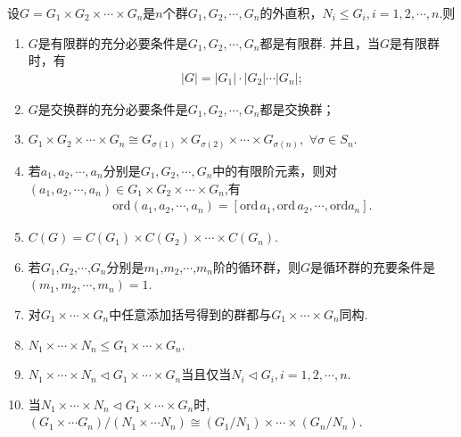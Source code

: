 \documentclass[../../main.tex]{subfiles}%
\begin{document}
\begin{theorem}\label{theorem:群的外直积的基本性质}
设$G =G_1 \times G_2\times \cdots \times G_n$是$n$个群$G_1,G_2,\cdots,G_n$的外直积，$N_i\leqslant G_i,i=1,2,\cdots,n$.则
\begin{enumerate}[(1)]
\item\label{theorem:群的外直积的基本性质-1} $G$是有限群的充分必要条件是$G_1,G_2,\cdots,G_n$都是有限群. 并且，当$G$是有限群时，有
\begin{align*}
|G| = |G_1| \cdot |G_2|\cdots|G_n|;
\end{align*}

\item\label{theorem:群的外直积的基本性质-2} $G$是交换群的充分必要条件是$G_1,G_2,\cdots,G_n$都是交换群；

\item\label{theorem:群的外直积的基本性质-3} $G_1\times G_2\times \cdots \times G_n\cong G_{\sigma \left( 1 \right)}\times G_{\sigma \left( 2 \right)}\times \cdots \times G_{\sigma \left( n \right)},\,\,\forall \sigma \in S_n.$

\item\label{theorem:群的外直积的基本性质-4} 若$a_1,a_2,\cdots,a_n$分别是$G_1,G_2,\cdots,G_n$中的有限阶元素，则对$(a_1,a_2,\cdots,a_n) \in G_1 \times G_2\times \cdots \times G_n$,有
\begin{align*}
\mathrm{ord}(a_1,a_2,\cdots ,a_n)=[\mathrm{ord}\,a_1,\mathrm{ord}\,a_2,\cdots ,\mathrm{ord}a_n].
\end{align*}

\item\label{theorem:群的外直积的基本性质-5} $C(G) = C(G_1) \times C(G_2) \times \cdots \times C(G_n)$.

\item\label{theorem:群的外直积的基本性质-6} 若$G_1$,$G_2$,$\cdots$,$G_n$分别是$m_1$,$m_2$,$\cdots$,$m_n$阶的循环群，则$G$是循环群的充要条件是$(m_1,m_2,\cdots,m_n) = 1$.

\item\label{theorem:群的外直积的基本性质-0} 对$G_1\times \cdots \times G_n$中任意添加括号得到的群都与$G_1\times \cdots \times G_n$同构.

\item\label{theorem:群的外直积的基本性质-7} $N_1\times \cdots \times N_n\leqslant G_1\times \cdots \times G_n$.

\item\label{theorem:群的外直积的基本性质-8} $N_1\times \cdots \times N_n\lhd G_1\times \cdots \times G_n$当且仅当$N_i\lhd G_i,i=1,2,\cdots,n.$

\item\label{theorem:群的外直积的基本性质-9} 当$N_1\times \cdots \times N_n\lhd G_1\times \cdots \times G_n$时,$(G_1\times \cdots G_n)/(N_1\times \cdots N_n)\cong (G_1/N_1)\times \cdots \times (G_n/N_n)$.
\end{enumerate}
\end{theorem}
\end{document}
